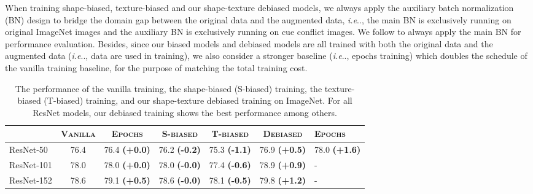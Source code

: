 \documentclass{article} \usepackage{iclr2021_conference,times}
\makeatletter
\DeclareRobustCommand\onedot{\futurelet\@let@token\@onedot}
\def\@onedot{\ifx\@let@token.\else.\null\fi\xspace}
\def\ie{\emph{i.e}\onedot} \def\Ie{\emph{I.e}\onedot}
\makeatother
\begin{document}
When training shape-biased, texture-biased and our shape-texture debiased models, we always apply the auxiliary batch normalization (BN) design \citep{xie2019adversarial,Xie2020intriguing,chen2021robust} to bridge the domain gap between the original data and the augmented data, \ie, the main BN is exclusively running on original ImageNet images and the auxiliary BN is exclusively running on cue conflict images. We follow \citet{xie2019adversarial} to always apply the main BN for performance evaluation. Besides, since our biased models and debiased models are all trained with both the original data and the augmented data (\ie,  data are used in training), we also consider a stronger baseline (\ie,  epochs training) which doubles the schedule of the vanilla training baseline, for the purpose of matching the total training cost.

\begin{table}[t]
\renewcommand\arraystretch{0.8}
\small
\centering
\begin{tabular}{l|cc|cc|cH}
\toprule
           & \scshape{Vanilla} & \scshape{Epochs}  & \scshape{S-biased} & \scshape{T-biased} & \scshape{Debiased} & \scshape{Epochs} \\
\midrule
ResNet-50  & 76.4    & 76.4 {\footnotesize \color{Highlight} \textbf{(+0.0)}}   & 76.2 {\footnotesize \color{red} \textbf{(-0.2)}}         & 75.3 {\footnotesize \color{red} \textbf{(-1.1)}}              & 76.9 {\footnotesize \color{Highlight} \textbf{(+0.5)}} & 78.0 {\footnotesize \color{Highlight} \textbf{(+1.6)}} \\
ResNet-101 & 78.0    & 78.0 {\footnotesize \color{Highlight} \textbf{(+0.0)}}   & 78.0 {\footnotesize \color{red} \textbf{(-0.0)}}            & 77.4 {\footnotesize \color{red} \textbf{(-0.6)}}              & 78.9 {\footnotesize \color{Highlight} \textbf{(+0.9)}} & -   \\
ResNet-152 & 78.6    & 79.1 {\footnotesize \color{Highlight} \textbf{(+0.5)}}   & 78.6 {\footnotesize \color{red} \textbf{(-0.0)}}         & 78.1 {\footnotesize \color{red} \textbf{(-0.5)}}              & 79.8 {\footnotesize \color{Highlight} \textbf{(+1.2)}} & - \\
\bottomrule
\end{tabular}
\vspace{-0.9em}
\caption{The performance of the vanilla training, the shape-biased (S-biased) training, the texture-biased (T-biased) training, and our shape-texture debiased training on ImageNet. For all ResNet models, our debiased training shows the best performance among others.}
\label{tab:imagenet_acc}
\vspace{-0.8em}
\end{table}
\end{document}

